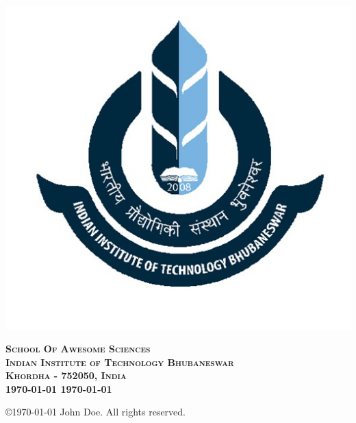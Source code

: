 \begin{titlepage}
\begin{center}
\includegraphics[scale=0.3]{iitbbs}
\vspace*{0.5cm}

\textsc{\Large \bfseries{School Of Awesome Sciences\\
Indian Institute of Technology Bhubaneswar\\
Khordha - 752050, India\\}}
{\Large \bfseries{\thismonth\today} {\thisyear\today}\\}
\vspace*{0.1cm}

\copyright {\thisyear\today} John Doe. All rights reserved.
\end{center}
\end{titlepage}

\newpage\null\newpage
